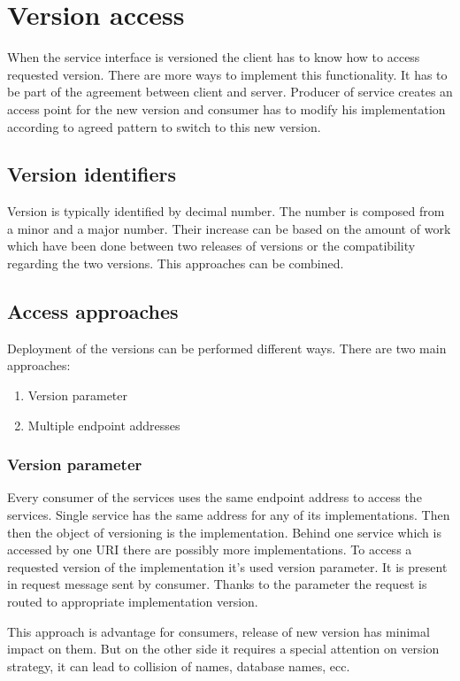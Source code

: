 \chapter{Version access}
\label{chap:versionaccess}

When the service interface is versioned the client has to know how to access requested version. There are more ways to implement this functionality. It has to be part of the agreement between client and server. Producer of service creates an access point for the new version and consumer has to modify his implementation according to agreed pattern to switch to this new version. 


\section{Version identifiers}
Version is typically identified by decimal number. The number is composed from a minor and a major number. Their increase can be based on the amount of work which have been done between two releases of versions or the compatibility regarding the two versions. This approaches can be combined.

\section{Access approaches}
Deployment of the versions can be performed different ways. There are two main approaches:
\begin{enumerate}
  \item Version parameter
  \item Multiple endpoint addresses
\end{enumerate}

\subsection{Version parameter}
Every consumer of the services uses the same endpoint address to access the services. Single service has the same address for any of its implementations. Then then the object of versioning is the implementation. Behind one service which is accessed by one URI there are possibly more implementations.
To access a requested version of the implementation it's used version parameter. It is present in request message sent by consumer. Thanks to the parameter the request is routed to appropriate implementation version.

This approach is advantage for consumers, release of new version has minimal impact on them. But on the other side it requires a special attention on version strategy, it can lead to collision of names, database names, ecc.

